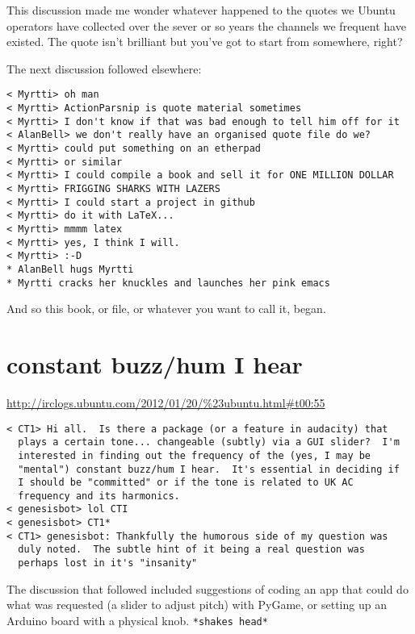 \documentclass[a4paper]{book}
\begin{document}
This discussion made me wonder whatever happened to the quotes we Ubuntu
operators have collected over the sever or so years the channels we frequent
have existed. The quote isn't brilliant but you've got to start from somewhere, right?
\newpage{}

The next discussion followed elsewhere:
\begin{verbatim}
< Myrtti> oh man
< Myrtti> ActionParsnip is quote material sometimes
< Myrtti> I don't know if that was bad enough to tell him off for it
< AlanBell> we don't really have an organised quote file do we?
< Myrtti> could put something on an etherpad
< Myrtti> or similar
< Myrtti> I could compile a book and sell it for ONE MILLION DOLLAR
< Myrtti> FRIGGING SHARKS WITH LAZERS
< Myrtti> I could start a project in github
< Myrtti> do it with LaTeX...
< Myrtti> mmmm latex
< Myrtti> yes, I think I will.
< Myrtti> :-D
* AlanBell hugs Myrtti 
* Myrtti cracks her knuckles and launches her pink emacs
\end{verbatim}

And so this book, or file, or whatever you want to call it, began.
\newpage{}

\section*{constant buzz/hum I hear}

\url{http://irclogs.ubuntu.com/2012/01/20/%23ubuntu.html#t00:55}
\begin{verbatim}
< CT1> Hi all.  Is there a package (or a feature in audacity) that 
  plays a certain tone... changeable (subtly) via a GUI slider?  I'm 
  interested in finding out the frequency of the (yes, I may be 
  "mental") constant buzz/hum I hear.  It's essential in deciding if 
  I should be "committed" or if the tone is related to UK AC 
  frequency and its harmonics.
< genesisbot> lol CTI
< genesisbot> CT1*
< CT1> genesisbot: Thankfully the humorous side of my question was 
  duly noted.  The subtle hint of it being a real question was 
  perhaps lost in it's "insanity"
\end{verbatim}

The discussion that followed included suggestions of coding an app that
could do what was requested (a slider to adjust pitch) with PyGame, or
setting up an Arduino board with a physical knob. \verb$*shakes head*$
\end{document}
